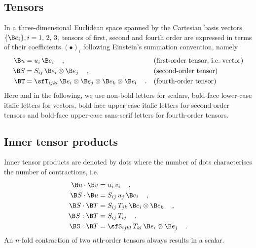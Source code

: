 \subsection{Tensors}
\label{sec_tensors}
In a three-dimensional Euclidean space spanned by the Cartesian basis vectors $\{\B e_{i}\}, i=1,\,2,\,3$, tensors of first, second and fourth order are expressed in terms of their coefficients $(\bullet)_i$ following Einstein's summation convention, namely
\begin{align*}
	\B u & = u_i \, \B e_i\, \quad, 														& &\text{(first-order~tensor,~i.e.~vector)} \\
	\B S & = S_{ij} \, \B e_i \otimes \B e_j\, \quad, 										& &\text{(second-order~tensor)}\\
	\BT  & = {\sfT}_{ijkl} \, \B e_i \otimes \B e_j \otimes \B e_k \otimes \B e_l\, \quad.	& &\text{(fourth-order~tensor)}
\end{align*}
Here and in the following, we use non-bold letters for scalars, bold-face lower-case italic letters for vectors, bold-face upper-case italic letters for second-order tensors and bold-face upper-case sans-serif letters for fourth-order tensors.


\subsection{Inner tensor products}
Inner tensor products are denoted by dots where the number of dots characterises the number of contractions, i.e.
\begin{align*}
	\B u \cdot \B v & = u_i\,v_i\, \quad,\\
	\B S \cdot \B u & = S_{ij}\,u_{j}\,\B e_i\, \quad,\\
	\B S \cdot \B T & = S_{ij}\,T_{jk}\,\B e_i \otimes \B e_k\, \quad,\\
	\B S : \B T     & = S_{ij}\,T_{ij}\, \quad,\\
	\BS : \B T      & = {\sfS}_{ijkl}\,T_{kl}\,\B e_i \otimes \B e_j\, \quad.
\end{align*}
An $n$-fold contraction of two $n$th-order tensors always results in a scalar.


